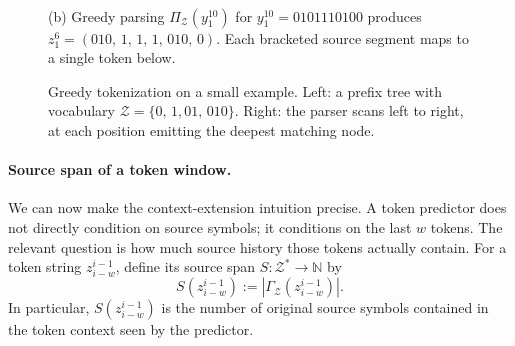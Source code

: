 \documentclass{article}
\theoremstyle{plain}
\theoremstyle{definition}
\theoremstyle{remark}
\begin{document}
\begin{figure}[t]
\begin{minipage}[c]{0.66\textwidth}
    \\[0.6em]
    {\small (b) Greedy parsing $\Pi_{\mathcal{Z}}(y_1^{10})$ for $y_1^{10} = 0101110100$ produces $z_1^{6} = (010,\, 1,\, 1,\, 1,\, 010,\, 0)$. Each bracketed source segment maps to a single token below.}
    \end{minipage}
    
    \caption{Greedy tokenization on a small example. Left: a prefix tree with vocabulary $\mathcal{Z}=\{0,\,1, 01, \,010\}$. Right: the parser scans left to right, at each position emitting the deepest matching node.}
    \label{fig:greedy_tokenization}
    \end{figure}
    
    \paragraph{Source span of a token window.}
    We can now make the context-extension intuition precise. A token predictor does
    not directly condition on source symbols; it conditions on the last $w$ tokens.
    The relevant question is how much source history those tokens actually contain.
    For a token string $z_{i-w}^{i-1}$, define its source span
    $S:\mathcal{Z}^*\to\mathbb{N}$ by
    \[
        S(z_{i-w}^{i-1})
        :=
        \left|
            \Gamma_{\mathcal{Z}}(z_{i-w}^{i-1})
        \right|.
    \]
    In particular, $S(z_{i-w}^{i-1})$ is the number of original source symbols
    contained in the token context seen by the predictor.
    
\end{document}

